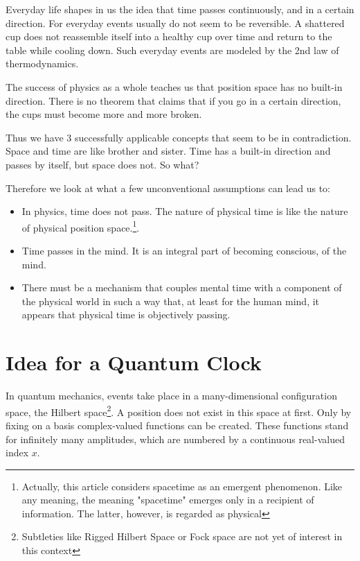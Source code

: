 \documentclass[12pt]{article}
\begin{document}
Everyday life shapes in us the idea that time passes continuously, and in a certain direction. For everyday events usually do not seem to be reversible. A shattered cup does not reassemble itself into a healthy cup over time and return to the table while cooling down. Such everyday events are modeled by the 2nd law of thermodynamics.

The success of physics as a whole teaches us that position space has no built-in direction. There is no theorem that claims that if you go in a certain direction, the cups must become more and more broken.

Thus we have 3 successfully applicable concepts that seem to be in contradiction. Space and time are like brother and sister. Time has a built-in direction and passes by itself, but space does not. So what?

Therefore we look at what a few unconventional assumptions can lead us to:

\begin{itemize}
\item In physics, time does not pass. The nature of physical time is like the nature of physical position space.\footnote{Actually, this article considers spacetime as an emergent phenomenon. Like any meaning, the meaning "spacetime" emerges only in a recipient of information. The latter, however, is regarded as physical}.
\item Time passes in the mind. It is an integral part of becoming conscious, of the mind. 
\item There must be a mechanism that couples mental time with a component of the physical world in such a way that, at least for the human mind, it appears that physical time is objectively passing.
\end{itemize}

\section{Idea for a Quantum Clock}

In quantum mechanics, events take place in a many-dimensional configuration space, the Hilbert space\footnote{Subtleties like Rigged Hilbert Space or Fock space are not yet of interest in this context}. A position does not exist in this space at first. Only by fixing on a basis complex-valued functions can be created. These functions stand for infinitely many amplitudes, which are numbered by a continuous real-valued index $x$.
\end{document}
